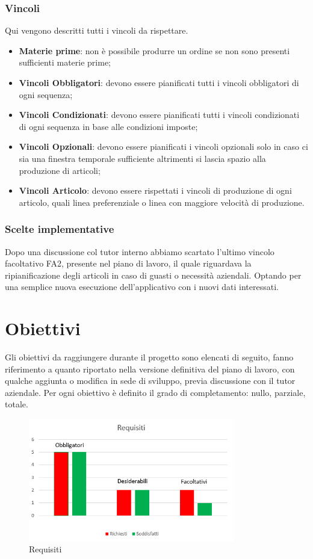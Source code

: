 \subsubsection{Vincoli}
Qui vengono descritti tutti i vincoli da rispettare.
\begin{itemize}
	
	\item \textbf{Materie prime}: non è possibile produrre un ordine se non sono presenti sufficienti materie prime;
	
	\item \textbf{Vincoli Obbligatori}: devono essere pianificati tutti i vincoli obbligatori di ogni sequenza;
	\item \textbf{Vincoli Condizionati}: devono essere pianificati tutti i vincoli condizionati di ogni sequenza in base alle condizioni imposte;
\item \textbf{Vincoli Opzionali}: devono essere pianificati i vincoli opzionali solo in caso ci sia una finestra temporale sufficiente altrimenti si lascia spazio alla produzione di articoli;
	\item \textbf{Vincoli Articolo}: devono essere rispettati i vincoli di produzione di ogni articolo, quali linea preferenziale o linea con maggiore velocità di produzione.
\end{itemize}

\subsubsection{Scelte implementative}
Dopo una discussione col tutor interno abbiamo scartato l'ultimo vincolo facoltativo FA2, presente nel piano di lavoro, il quale riguardava la ripianificazione degli articoli in caso di guasti o necessità aziendali. Optando per una semplice nuova esecuzione dell'applicativo con i nuovi dati interessati. 

\section{Obiettivi}

Gli obiettivi da raggiungere durante il progetto sono elencati di seguito, fanno riferimento a quanto riportato nella versione definitiva del piano di lavoro, con qualche aggiunta o modifica in sede di sviluppo, previa discussione con il tutor aziendale.
Per ogni obiettivo è definito il grado di completamento: nullo, parziale, totale.

\begin{figure}[h]
	\includegraphics[width=9cm]{res/images/requisiti.png}
	\centering
	\caption{Requisiti}
\end{figure}


